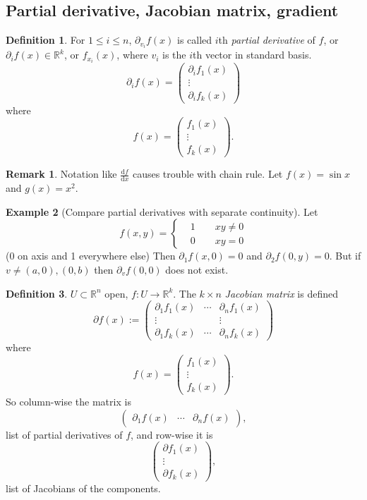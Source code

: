 \documentclass[a4paper]{article}
\theoremstyle{definition}
\newtheorem{defn}{Definition}[subsection]
\newtheorem{eg}[defn]{Example}
\newtheorem*{remark}{Remark}
\begin{document}
\subsection{Partial derivative, Jacobian matrix, gradient}
\begin{defn}
For $1\leq i\leq n$, $\partial_{v_i}f(x)$ is called $i$th \textit{partial derivative} of $f$, or $\partial_i f(x) \in \mathbb R^k$, or $f_{x_i}(x)$, where $v_i$ is the $i$th vector in standard basis.
\[
\partial_i f(x) = \begin{pmatrix}\partial_i f_1(x) \\ \vdots \\ \partial_i f_k(x)\end{pmatrix}
\]
where
\[
f(x)=\begin{pmatrix}f_1(x)\\ \vdots \\ f_k(x)\end{pmatrix}.
\]
\end{defn}
\begin{remark}
Notation like $\frac{\mathrm d f}{\mathrm d x}$ causes trouble with chain rule. Let $f(x)=\sin x$ and $g(x)=x^2$. 
\end{remark}

\begin{eg}[Compare partial derivatives with separate continuity]
Let
\[
f(x,y)=\left\{\begin{aligned}&1\qquad xy\neq 0\\&0\qquad xy=0\end{aligned} \right.
\]
(0 on axis and 1 everywhere else) Then $\partial_1 f(x,0)=0$ and $\partial_2 f(0,y)=0$. But if $v\neq (a,0),(0,b)$ then $\partial_v f(0,0)$ does not exist.
\end{eg}
\begin{defn}
$U\subset \mathbb R^n$ open, $f:U\rightarrow \mathbb R^k$. The $k\times n$ \textit{Jacobian matrix} is defined
\[
\partial f(x):=\begin{pmatrix} \partial_1 f_1(x) & \cdots & \partial_n f_1(x) \\
\vdots & & \vdots \\ \partial_1 f_k(x) & \cdots & \partial_n f_k(x) \end{pmatrix}
\]
where
\[
f(x)=\begin{pmatrix}f_1(x)\\ \vdots \\ f_k(x)\end{pmatrix}.
\]
So column-wise the matrix is
\[
\begin{pmatrix}\partial_1 f(x) & \cdots & \partial_n f(x)\end{pmatrix},
\]
list of partial derivatives of $f$, and row-wise it is
\[
\begin{pmatrix}\partial f_1(x) \\ \vdots \\ \partial f_k(x)\end{pmatrix},
\]
list of Jacobians of the components.
\end{defn}
\end{document}
